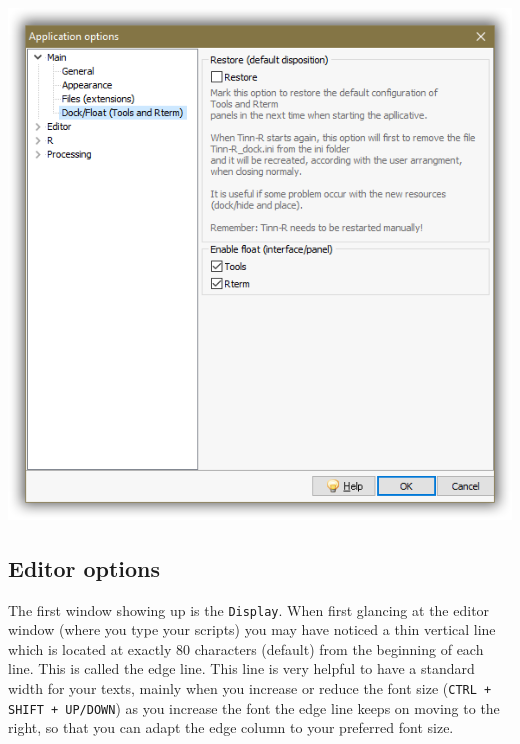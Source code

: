 \includegraphics[scale=0.50]{./res/app_main_dock.png}


\subsection{Editor options}

The first window showing up is the \texttt{Display}. When first glancing at the editor window (where you type your scripts)
you may have noticed a thin vertical line which is located at exactly 80 characters (default) from the beginning of each line.
This is called the edge line. This line is very helpful to have a standard width for your texts,
mainly when you increase or reduce the font size (\texttt{CTRL + SHIFT + UP/DOWN})
as you increase the font the edge line keeps on moving to the right,
so that you can adapt the edge column to your preferred font size.

